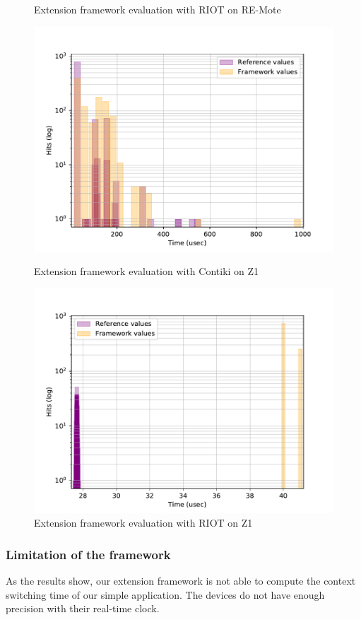 \begin{figure}[!ht]
\begin{minipage}{.45\textwidth}
      \caption{Extension framework evaluation with RIOT on RE-Mote\label{fig:comparison-extension-framework-riot-remote}}
  \end{minipage}
\end{figure}

\begin{figure}[!ht]
  \begin{minipage}{.45\textwidth}
      \centering
      \includegraphics[scale=.4]{assets/comparison-extension-framework-contiki-z1.pdf}
      \caption{Extension framework evaluation with Contiki on Z1\label{fig:comparison-extension-framework-contiki-z1}}
  \end{minipage}\hfill
  \begin{minipage}{.45\textwidth}        
      \centering
      \includegraphics[scale=.4]{assets/comparison-extension-framework-riot-z1.pdf}
      \caption{Extension framework evaluation with RIOT on Z1\label{fig:comparison-extension-framework-riot-z1}}
  \end{minipage}
\end{figure}

\subsubsection{Limitation of the framework}
As the results show, our extension framework is not able to compute the context switching time of our simple application.
The devices do not have enough precision with their real-time clock.